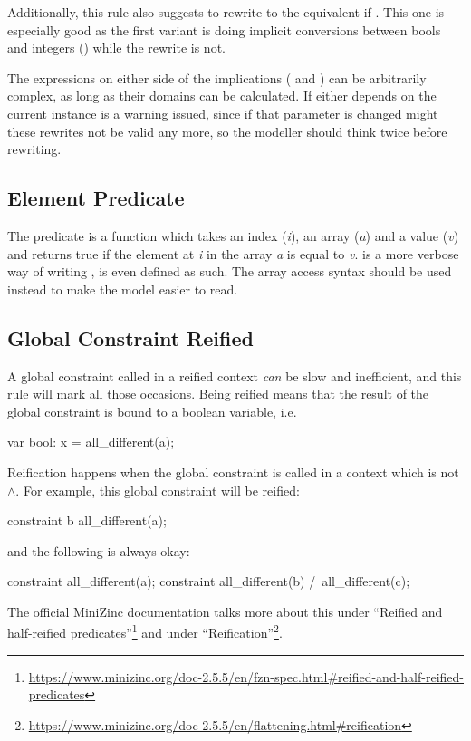 \documentclass[a4paper,12pt]{article}
\begin{document}
Additionally, this rule also suggests to rewrite  to the
equivalent  if . This one is especially good
as the first variant is doing implicit conversions between bools and integers
() while the rewrite is not.

The expressions on either side of the implications ( and ) can be arbitrarily
complex, as long as their domains can be calculated. If either depends on the current
instance is a warning issued, since if that parameter is changed might these rewrites not
be valid any more, so the modeller should think twice before rewriting.

\subsection{Element Predicate}\label{sec:rule:element}
The predicate  is a function which takes an index (\emph{i}), an array
(\emph{a}) and a value (\emph{v}) and returns true if the element at \emph{i} in the array
\emph{a} is equal to \emph{v}.  is a more verbose way of writing
,  is even defined as such. The array
access syntax should be used instead to make the model easier to read.

\subsection{Global Constraint Reified}\label{sec:rule:reifiedglobal}
A global constraint called in a reified context \emph{can} be slow and inefficient,
and this rule will mark all those occasions. Being reified means that the result of the global
constraint is bound to a boolean variable, i.e.\@
\begin{mznnobreak}
var bool: x = all_different(a);
\end{mznnobreak}
Reification happens when the global constraint is called in a context which is not $\land$.
For example, this global constraint will be reified:
\begin{mznnobreak}
constraint b \/ all_different(a);
\end{mznnobreak}
and the following is always okay:
\begin{mznnobreak}
constraint all_different(a);
constraint all_different(b) /\ all_different(c);
\end{mznnobreak}
The official MiniZinc documentation talks more about this under ``Reified and half-reified
predicates''\footnote{\url{https://www.minizinc.org/doc-2.5.5/en/fzn-spec.html\#reified-and-half-reified-predicates}}
and under ``Reification''\footnote{\url{https://www.minizinc.org/doc-2.5.5/en/flattening.html\#reification}}.
\end{document}
